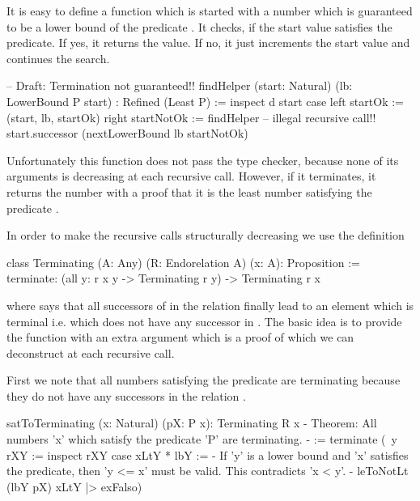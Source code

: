 It is easy to define a function  which is started with a number
which is guaranteed to be a lower bound of the predicate . It checks, if
the start value satisfies the predicate. If yes, it returns the value. If no, it
just increments the start value and continues the search.
%
\begin{alba}
    -- Draft: Termination not guaranteed!!
    findHelper (start: Natural) (lb: LowerBound P start) : Refined (Least P) :=
        inspect d start case
            left startOk :=
                (start, lb, startOk)
            right startNotOk :=
                findHelper  -- illegal recursive call!!
                    start.successor
                    (nextLowerBound lb startNotOk)
\end{alba}
%
Unfortunately this function does not pass the type checker, because none of its
arguments is decreasing at each recursive call. However, if it terminates, it
returns the number with a proof that it is the least number satisfying the
predicate .

In order to make the recursive calls structurally decreasing we use the
definition
%
\begin{alba}
    class Terminating (A: Any) (R: Endorelation A) (x: A): Proposition :=
        terminate: (all y: r x y -> Terminating r y) -> Terminating r x
\end{alba}
%
where  says that all successors of  in the
relation  finally lead to an element which is terminal i.e. which does
not have any successor in . The basic idea is to provide the function
 with an extra argument which is a proof of  which we can deconstruct at each recursive call.



First we note that all numbers satisfying the predicate  are terminating
because they do not have any successors in the relation .

\begin{alba}
    satToTerminating (x: Natural) (pX: P x): Terminating R x
    {- Theorem: All numbers 'x' which satisfy the predicate 'P' are
       terminating. -}
    :=
        terminate
            (\ y rXY :=
                inspect rXY case
                    xLtY * lbY :=
                        {- If 'y' is a lower bound and 'x' satisfies the
                           predicate, then 'y <= x' must be valid. This
                           contradicts 'x < y'. -}
                        leToNotLt (lbY pX) xLtY |> exFalso)
\end{alba}



